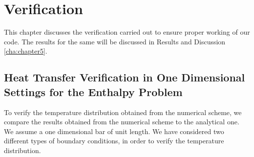 \chapter{Verification\label{cha:chapter5}}
This chapter discusses the verification carried out to ensure proper working of our code. The results for the same will be discussed in Results and Discussion \ref{cha:chapter5}.

\section{Heat Transfer Verification in One Dimensional Settings for the Enthalpy Problem}
To verify the temperature distribution obtained from the numerical scheme, we compare the results obtained from the numerical scheme to the analytical one. We assume a one dimensional bar of unit length. We have considered two different types of boundary conditions, in order to verify the temperature distribution.\\

